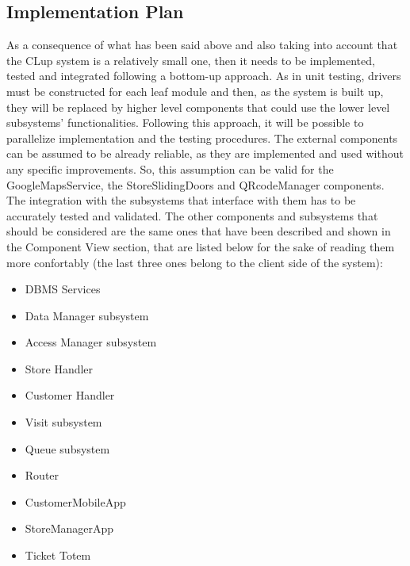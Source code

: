 \documentclass[]{article}
\begin{document}
			\subsection{Implementation Plan}
			\medskip
			As a consequence of what has been said above and also taking into account that the CLup system is a relatively small one, then it needs to be implemented, tested and integrated following a bottom-up approach. As in unit testing, drivers must be constructed for each leaf module and then, as the system is built up, they will be replaced by higher level components that could use the lower level subsystems’ functionalities. Following this approach, it will be possible to parallelize implementation and the testing procedures.\newline
\noindent
The external components can be assumed to be already reliable, as they are implemented and used without any specific improvements. So, this assumption can be valid for the GoogleMapsService, the StoreSlidingDoors and QRcodeManager components. The integration with the subsystems that interface with them has to be accurately tested and validated.\newline
\noindent
The other components and subsystems that should be considered are the same ones that have been described and shown in the Component View section, that are listed below for the sake of reading them more confortably (the last three ones belong to the client side of the system):
				\begin{itemize}
					\item DBMS Services
					\item Data Manager subsystem
					\item Access Manager subsystem
					\item Store Handler
					\item Customer Handler
					\item Visit subsystem
					\item Queue subsystem
					\item Router
					\item CustomerMobileApp
					\item StoreManagerApp
					\item Ticket Totem
				\end{itemize}
\end{document}
